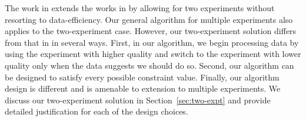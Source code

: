 \documentclass[journal, onecolumn]{IEEEtran}
\begin{document}
The work in \cite{ren2017} extends the works in \cite{banerjee2013, banerjee2012-2, banerjee2015, banerjee2013-2, banerjee2013-3, banerjee2015-2, banerjee2015-3} by allowing for two experiments without resorting to data-efficiency. Our general algorithm for multiple experiments also applies to the two-experiment case. However, our two-experiment solution differs from that in \cite{ren2017} in several ways. First, in our algorithm, we begin processing data by using the experiment with higher quality and switch to the experiment with lower quality only when the data suggests we should do so. Second, our algorithm can be designed to satisfy every possible constraint value. Finally, our algorithm design is different and is amenable to extension to multiple experiments. We discuss our two-experiment solution in Section~\ref{sec:two-expt} and provide detailed justification for each of the design choices. 







%
%
\end{document}
